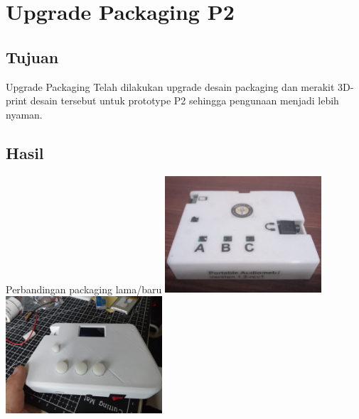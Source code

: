 \documentclass[table,dvipsnames]{beamer}
\begin{document}
	\section{Upgrade Packaging P2}

	\begin{frame}
		\subsection{Tujuan}
		\begin{exampleblock}{Upgrade Packaging}
			Telah dilakukan upgrade desain packaging dan merakit 3D-print desain tersebut untuk prototype P2 sehingga pengunaan menjadi lebih nyaman.
		\end{exampleblock}

		\subsection{Hasil}
		\begin{exampleblock}{Perbandingan packaging lama/baru}
			\includegraphics[width=165pt]{images/pack_lama}
			\includegraphics[width=165pt]{images/pack_jadi}
		\end{exampleblock}
	\end{frame}
\end{document}
